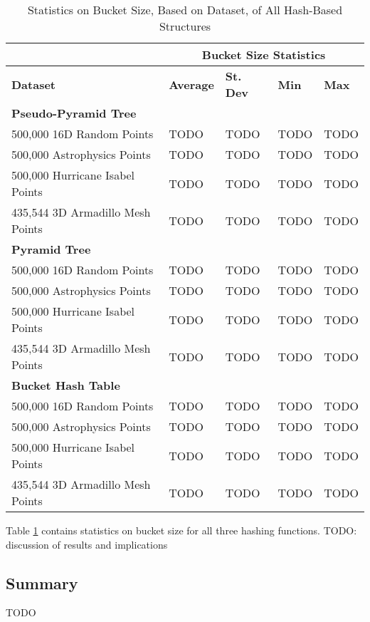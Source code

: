 \begin{table}
	\centering
	\begin{tabular}{|l|l|l|l|l|}
		\hline
		\textbf{} & \multicolumn{4}{c|}{\textbf{Bucket Size Statistics}} \\
		\hline
		\textbf{Dataset} & \textbf{Average} & \textbf{St. Dev} & \textbf{Min} & \textbf{Max} \\
		\hline
		\textbf{Pseudo-Pyramid Tree} & & & & \\
		500,000 16D Random Points & TODO & TODO & TODO & TODO \\
		500,000 Astrophysics Points & TODO & TODO & TODO & TODO \\
		500,000 Hurricane Isabel Points & TODO & TODO & TODO & TODO \\
		435,544 3D Armadillo Mesh Points & TODO & TODO & TODO & TODO \\
		\hline
		\textbf{Pyramid Tree} & & & & \\
		500,000 16D Random Points & TODO & TODO & TODO & TODO \\
		500,000 Astrophysics Points & TODO & TODO & TODO & TODO \\
		500,000 Hurricane Isabel Points & TODO & TODO & TODO & TODO \\
		435,544 3D Armadillo Mesh Points & TODO & TODO & TODO & TODO \\
		\hline
		\textbf{Bucket Hash Table} & & & & \\
		500,000 16D Random Points & TODO & TODO & TODO & TODO \\
		500,000 Astrophysics Points & TODO & TODO & TODO & TODO \\
		500,000 Hurricane Isabel Points & TODO & TODO & TODO & TODO \\
		435,544 3D Armadillo Mesh Points & TODO & TODO & TODO & TODO \\
		\hline
	\end{tabular}
	\caption{Statistics on Bucket Size, Based on Dataset, of All Hash-Based Structures}
	\label{tab:perf2-bucket-stats}
\end{table}

Table \ref{tab:perf2-bucket-stats} contains statistics on bucket size for all three hashing functions. TODO: discussion of results and implications

\subsection{Summary}

TODO

